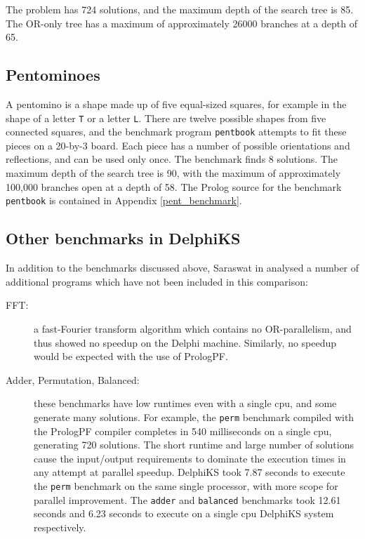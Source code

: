The problem has 724 solutions, and the
maximum depth of the search tree is 85.  The OR-only tree has a maximum of
approximately 26000 branches at a depth of 65.


\subsection{Pentominoes}

A pentomino is a shape made up of five equal-sized squares, for example in the
shape of a letter \texttt{T} or a letter \texttt{L}.
There are twelve possible shapes from five connected squares, and the
 benchmark program
\texttt{pentbook} attempts to fit these pieces on a 20-by-3 board.
Each piece has a number of possible orientations and reflections, and 
can be used only once. The
benchmark finds 8 solutions.
The maximum depth of the search tree is 90, with the maximum of approximately
100,000 branches open at a depth of 58.
The Prolog source for the benchmark \texttt{pentbook} is contained in 
Appendix \ref{pent_benchmark}.

\subsection{Other benchmarks in DelphiKS}

In addition to the benchmarks discussed above, Saraswat in \cite{Sar95}
analysed a
number of additional programs which have not been included in this comparison:
\begin{description}
\item[FFT:]{ a fast-Fourier transform algorithm which contains no
  OR-parallelism, and thus showed no speedup on the Delphi machine.  Similarly,
  no speedup would be expected with the use of PrologPF.}
\item[Adder, Permutation, Balanced:]{ these benchmarks have low runtimes
  even with a single cpu, and some generate many solutions.  For example, the
  \texttt{perm} benchmark compiled with the PrologPF compiler completes in
  540 milliseconds on a single cpu, generating 720 solutions.
  The short runtime and large
  number of solutions cause the input/output requirements to dominate the
  execution times in any attempt at parallel speedup.
  DelphiKS took
  7.87 seconds to execute the \texttt{perm} benchmark on the same single
  processor, with more scope for parallel improvement. The \texttt{adder}
  and \texttt{balanced} benchmarks took 12.61 seconds and 6.23 seconds
  to execute on a single cpu DelphiKS system respectively.}
\end{description}


